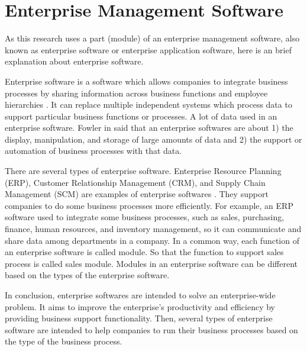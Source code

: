 \section{Enterprise Management Software}
As this research uses a part (module) of an enterprise management software, also known as enterprise software or enterprise application software, here is an brief explanation about enterprise software. 

Enterprise software is a software which allows companies to integrate business processes by sharing information across business functions and employee hierarchies \citep{book.olson2010.enterpriseIS}. It can replace multiple independent systems which process data to support particular business functions or processes. A lot of data used in an enterprise software. Fowler in \citep{book.fowler2002.patternsEnterpriseApp} said that an enterprise softwares are about 1) the display, manipulation, and storage of large amounts of data and 2) the support or automation of business processes with that data.

There are several types of enterprise software. Enterprise Resource Planning (ERP), Customer Relationship Management (CRM), and Supply Chain Management (SCM) are examples of enterprise softwares \citep{web.erp.typeEnterpriseSystem}. They support companies to do some business processes more efficiently. For example, an ERP software used to integrate some business processes, such as sales, purchasing, finance, human resources, and inventory management, so it can communicate and share data among departments in a company. In a common way, each function of an enterprise software is called module. So that the function to support sales process is called sales module. Modules in an enterprise software can be different based on the types of the enterprise software.

In conclusion, enterprise softwares are intended to solve an enterprise-wide problem. It aims to improve the enterprise's productivity and efficiency by providing business support functionality. Then, several types of enterprise software are intended to help companies to run their business processes based on the type of the business process.